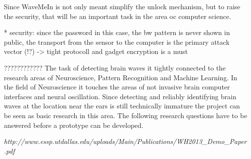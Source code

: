 Since WaveMeIn is not only meant simplify the unlock mechanism, but to raise the security, that will be an important task in the area oc computer science.

* security: since the password in this case, the bw pattern is never shown in public, the transport from the sensor to the computer is the primary attack vector (!?) -> tight protocoll and gadget encryption is a must


????????????
The task of detecting brain waves it tightly connected to the research areas of Neuroscience, Pattern Recognition and Machine Learning. In the field of Neuroscience it touches the areas of not invasive brain computer interfaces and neural oscillation. Since detecting and reliably identifying brain waves at the location near the ears is still technically immature the project can be seen as basic research in this area. The following research questions have to be answered before a prototype can be developed.

\em{http://www.essp.utdallas.edu/uploads/Main/Publications/WH2013\_Demo\_Paper.pdf}